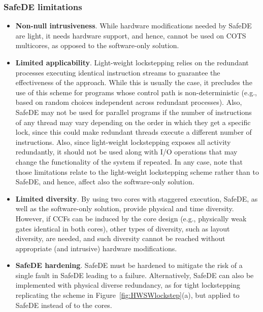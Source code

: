 \subsubsection{SafeDE limitations}
\begin{itemize}
\item \textbf{Non-null intrusiveness}. While hardware modifications needed by SafeDE are light, it needs hardware support, and hence, cannot be used on COTS multicores, as opposed to the software-only solution.
\item \textbf{Limited applicability}. Light-weight lockstepping relies on the redundant processes executing identical instruction streams to guarantee the effectiveness of the approach. While this is usually the case, it precludes the use of this scheme for programs whose control path is non-deterministic (e.g., based on random choices independent across redundant processes). 
Also, SafeDE may not be used for parallel programs if the number of instructions of any thread may vary depending on the order in which they get a specific lock, since this could make redundant threads execute a different number of instructions. 
Also, since light-weight lockstepping exposes all activity redundantly, it should not be used along with I/O operations that may change the functionality of the system if repeated. In any case, note that those limitations relate to the light-weight lockstepping scheme rather than to SafeDE, and hence, affect also the software-only solution.
\item \textbf{Limited diversity}. By using two cores with staggered execution, SafeDE, as well as the software-only solution, provide physical and time diversity. However, if CCFs can be induced by the core design (e.g., physically weak gates identical in both cores), other types of diversity, such as layout diversity, are needed, and such diversity cannot be reached without appropriate (and intrusive) hardware modifications.
\item \textbf{SafeDE hardening}. SafeDE must be hardened to mitigate the risk of a single fault in SafeDE leading to a failure. Alternatively, SafeDE can also be implemented with physical diverse redundancy, as for tight lockstepping replicating the scheme in Figure~\ref{fig:HWSWlockstep}(a), but applied to SafeDE instead of to the cores.
\end{itemize}

